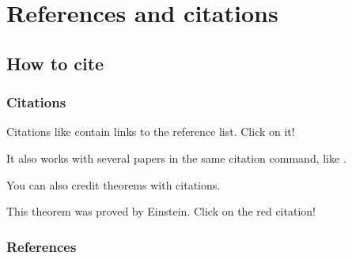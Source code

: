 \documentclass{beamer}
\begin{document}
\section{References and citations}

\subsection{How to cite}

\begin{frame}
    \frametitle{Citations}

    Citations like \cite{knuth-fa} contain links to the reference list. Click on it!

    It also works with several papers in the same citation command, like \cite{dirac,knuthwebsite}.

    You can also credit theorems with citations.

    \begin{theorem}
        This theorem was proved by Einstein. Click on the red citation!
    \end{theorem}

\end{frame}



\begin{frame}
    \frametitle{References}

    
    

\end{frame}
\end{document}
